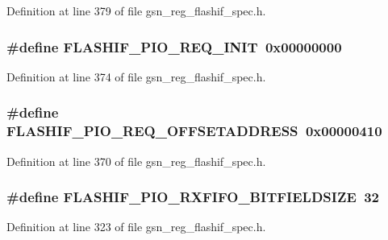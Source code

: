 Definition at line 379 of file gsn\_\-reg\_\-flashif\_\-spec.h.

\hypertarget{a00552_a0d0cbb5ce6608b2bf1781c4f3893ad12}{
\subsubsection[{FLASHIF\_\-PIO\_\-REQ\_\-INIT}]{\setlength{\rightskip}{0pt plus 5cm}\#define FLASHIF\_\-PIO\_\-REQ\_\-INIT~0x00000000}}
\label{a00552_a0d0cbb5ce6608b2bf1781c4f3893ad12}


Definition at line 374 of file gsn\_\-reg\_\-flashif\_\-spec.h.

\hypertarget{a00552_afc997c0155d60552396d36e75058ea06}{
\subsubsection[{FLASHIF\_\-PIO\_\-REQ\_\-OFFSETADDRESS}]{\setlength{\rightskip}{0pt plus 5cm}\#define FLASHIF\_\-PIO\_\-REQ\_\-OFFSETADDRESS~0x00000410}}
\label{a00552_afc997c0155d60552396d36e75058ea06}


Definition at line 370 of file gsn\_\-reg\_\-flashif\_\-spec.h.

\hypertarget{a00552_ab0b34b7ef79aff2c1b62e2978107344f}{
\subsubsection[{FLASHIF\_\-PIO\_\-RXFIFO\_\-BITFIELDSIZE}]{\setlength{\rightskip}{0pt plus 5cm}\#define FLASHIF\_\-PIO\_\-RXFIFO\_\-BITFIELDSIZE~32}}
\label{a00552_ab0b34b7ef79aff2c1b62e2978107344f}


Definition at line 323 of file gsn\_\-reg\_\-flashif\_\-spec.h.

